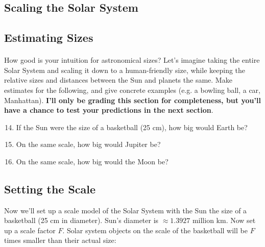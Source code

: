 \documentclass[12pt]{article}
\begin{document}
\begin{enumerate}


\section*{Scaling the Solar System}

\subsection*{Estimating Sizes} \label{guesses}
\paragraph{}
How good is your intuition for astronomical sizes? Let's imagine taking the entire Solar System and scaling it down to a human-friendly size, while keeping the relative sizes and distances between the Sun and planets the same. Make estimates for the following, and give concrete examples (e.g. a bowling ball, a car, Manhattan). \textbf{I'll only be grading this section for completeness, but you'll have a chance to test your predictions in the next section}.

\begin{enumerate}
\setcounter{enumi}{13}
\item If the Sun were the size of a basketball (25 cm), how big would Earth be?
\item On the same scale, how big would Jupiter be?
\item On the same scale, how big would the Moon be?
\end{enumerate}

\subsection*{Setting the Scale} \label{calculations}
Now we'll set up a scale model of the Solar System with the Sun the size of a basketball (25 cm in diameter).
Sun's diameter is $\approx 1.3927$ million km. Now set up a scale factor $F$. Solar system objects on the scale of the basketball will be $F$ times smaller than their actual size:


\end{enumerate}
\end{document}
